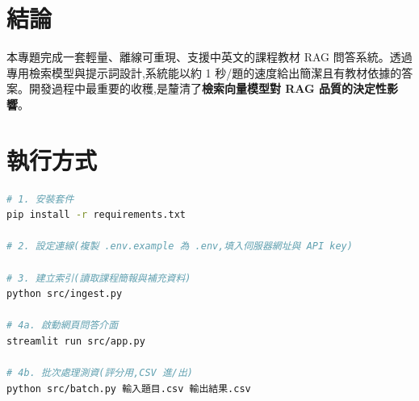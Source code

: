 \documentclass[12pt]{ctexart}
\begin{document}
\section{結論}
本專題完成一套輕量、離線可重現、支援中英文的課程教材 RAG 問答系統。透過專用檢索模型與提示詞設計,系統能以約 1 秒/題的速度給出簡潔且有教材依據的答案。開發過程中最重要的收穫,是釐清了\textbf{檢索向量模型對 RAG 品質的決定性影響}。

\appendix
\section{執行方式}
\begin{lstlisting}[language=bash]
# 1. 安裝套件
pip install -r requirements.txt

# 2. 設定連線(複製 .env.example 為 .env,填入伺服器網址與 API key)

# 3. 建立索引(讀取課程簡報與補充資料)
python src/ingest.py

# 4a. 啟動網頁問答介面
streamlit run src/app.py

# 4b. 批次處理測資(評分用,CSV 進/出)
python src/batch.py 輸入題目.csv 輸出結果.csv
\end{lstlisting}
\end{document}
